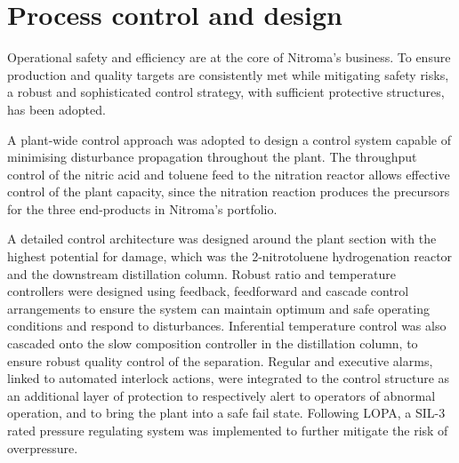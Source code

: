 \section*{Process control and design}

Operational safety and efficiency are at the core of Nitroma's business. To ensure production and quality targets are consistently met while mitigating safety risks, a robust and sophisticated control strategy, with sufficient protective structures, has been adopted.

A plant-wide control approach was adopted to design a control system capable of minimising disturbance propagation throughout the plant.  The throughput control of the nitric acid and toluene feed to the nitration reactor allows effective control of the plant capacity, since the nitration reaction produces the precursors for the three end-products in Nitroma's portfolio.   


A detailed control architecture was designed around the plant section with the highest potential for damage, which was the 2-nitrotoluene hydrogenation reactor and the downstream distillation column. Robust ratio and temperature controllers were designed using feedback, feedforward and cascade control arrangements to ensure the system can maintain optimum and safe operating conditions and respond to disturbances. Inferential temperature control was also cascaded onto the slow composition controller in the distillation column, to ensure robust quality control of the separation. Regular and executive alarms, linked to automated interlock actions, were integrated to the control structure as an additional layer of protection to respectively alert to operators of abnormal operation, and to bring the plant into a safe fail state. Following LOPA, a SIL-3 rated pressure regulating system was implemented to further mitigate the risk of overpressure.




